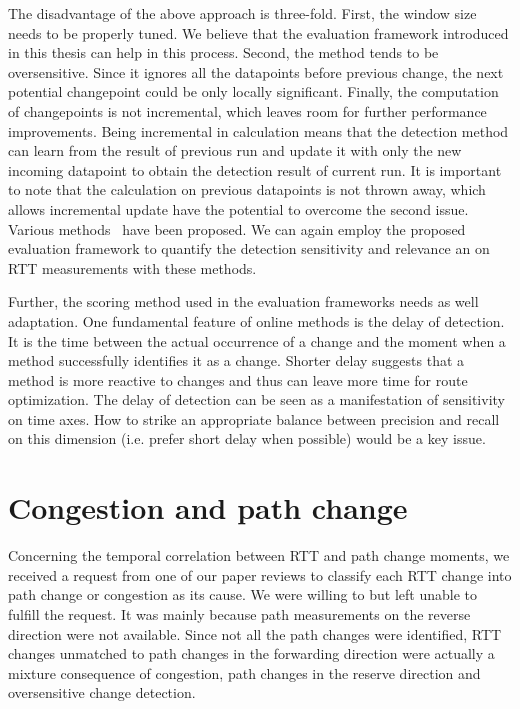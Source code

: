 The disadvantage of the above approach is three-fold. First, the window size needs to be properly tuned. We believe that the evaluation framework introduced in this thesis can help in this process. 
Second, the method tends to be oversensitive. Since it ignores all the datapoints before previous change, the next potential changepoint could be only locally significant. Finally, the computation of changepoints is not incremental, which leaves room for further performance improvements. Being incremental in calculation means that the detection method can learn from the result of previous run and update it with only the new incoming datapoint to obtain the detection result of current run. 
It is important to note that the calculation on previous datapoints is not thrown away, which allows incremental update have the potential to overcome the second issue.
Various methods~\cite{Caron2012,Turner2009a,Sharkey2014,Ho2014,Adams2007,Conditions2015} have been proposed. We can again employ the proposed evaluation framework to quantify the detection sensitivity and relevance an on RTT measurements with these methods.

Further, the scoring method used in the evaluation frameworks needs as well adaptation.
One fundamental feature of online methods is the delay of detection. It is the time between the actual occurrence of a change and the moment when a method successfully identifies it as a change. Shorter delay suggests that a method is more reactive to changes and thus can leave more time for route optimization. The delay of detection can be seen as a manifestation of sensitivity on time axes. How to strike an appropriate balance between precision and recall on this dimension (i.e. prefer short delay when possible) would be a key issue.

\section{Congestion and path change}
Concerning the temporal correlation between RTT and path change moments, we received a request from one of our paper reviews to classify each RTT change into path change or congestion as its cause. We were willing to but left unable to fulfill the request.
It was mainly because path measurements on the reverse direction were not available. Since not all the path changes were identified, RTT changes unmatched to path changes in the forwarding direction were actually a mixture consequence of congestion, path changes in the reserve direction and oversensitive change detection.

